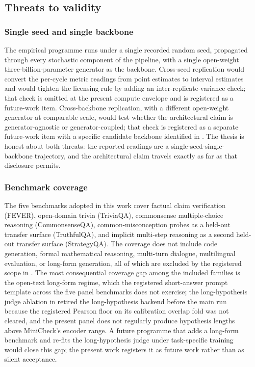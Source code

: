 \subsection{Threats to validity}
\label{sec:disc-threats}

\subsubsection{Single seed and single backbone}
\label{sec:disc-threat-seed}

The empirical programme runs under a single recorded random seed, propagated through every stochastic component of the pipeline, with a single open-weight three-billion-parameter generator as the backbone. Cross-seed replication would convert the per-cycle metric readings from point estimates to interval estimates and would tighten the licensing rule by adding an inter-replicate-variance check; that check is omitted at the present compute envelope and is registered as a future-work item. Cross-backbone replication, with a different open-weight generator at comparable scale, would test whether the architectural claim is generator-agnostic or generator-coupled; that check is registered as a separate future-work item with a specific candidate backbone identified in . The thesis is honest about both threats: the reported readings are a single-seed-single-backbone trajectory, and the architectural claim travels exactly as far as that disclosure permits.

\subsubsection{Benchmark coverage}
\label{sec:disc-threat-benchmark}

The five benchmarks adopted in this work cover factual claim verification (FEVER), open-domain trivia (TriviaQA), commonsense multiple-choice reasoning (CommonsenseQA), common-misconception probes as a held-out transfer surface (TruthfulQA), and implicit multi-step reasoning as a second held-out transfer surface (StrategyQA). The coverage does not include code generation, formal mathematical reasoning, multi-turn dialogue, multilingual evaluation, or long-form generation, all of which are excluded by the registered scope in . The most consequential coverage gap among the included families is the open-text long-form regime, which the registered short-answer prompt template across the five panel benchmarks does not exercise; the long-hypothesis judge ablation in  retired the long-hypothesis backend before the main run because the registered Pearson floor on its calibration overlap fold was not cleared, and the present panel does not regularly produce hypothesis lengths above MiniCheck's encoder range. A future programme that adds a long-form benchmark and re-fits the long-hypothesis judge under task-specific training would close this gap; the present work registers it as future work rather than as silent acceptance.

